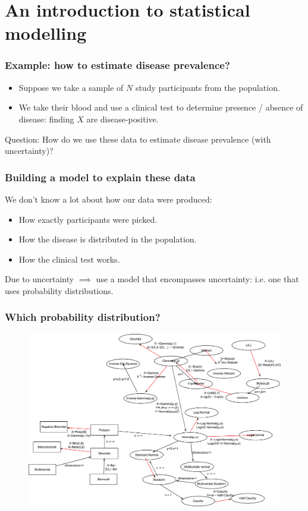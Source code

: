 \documentclass[handout]{beamer}
\begin{document}
\section{An introduction to statistical modelling}
\frame{\tableofcontents[currentsection]}

\begin{frame}
	\frametitle{Example: how to estimate disease prevalence?}
	
	\begin{itemize}
		\item Suppose we take a sample of $N$ study participants from the population.
		\item We take their blood and use a clinical test to determine presence / absence of disease: finding $X$ are disease-positive.
	\end{itemize}
	
	Question: How do we use these data to estimate disease prevalence (with uncertainty)?
	
\end{frame}

\begin{frame}
	\frametitle{Building a model to explain these data}
	
	We don't know a lot about how our data were produced:
	
	\begin{itemize}
	\item How exactly participants were picked.
	\item How the disease is distributed in the population.
	\item How the clinical test works.
	\end{itemize}
	
	Due to uncertainty $\implies$ use a model that encompasses uncertainty: i.e. one that uses probability distributions.
	
\end{frame}

\begin{frame}
	\frametitle{Which probability distribution?}
	
		\begin{figure}[h]
			\centerline{\includegraphics[width=1\textwidth]{figures/Distributions_nexusOfRelations.pdf}}
		\end{figure}
	
\end{frame}
\end{document}
